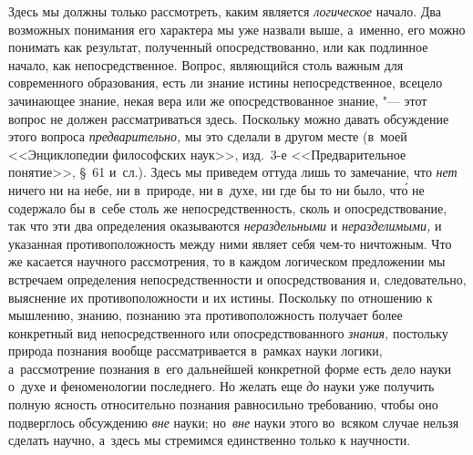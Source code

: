 Здесь мы должны только рассмотреть, каким является {\em логическое} начало. Два
возможных понимания его характера мы уже назвали выше, а~именно, его можно
понимать как результат, полученный опосредствованно, или как подлинное начало,
как непосредственное. Вопрос, являющийся столь важным для современного
образования, есть ли знание истины непосредственное, всецело зачинающее знание,
некая вера или же опосредствованное знание, "--- этот вопрос не должен
рассматриваться здесь. Поскольку можно давать обсуждение этого вопроса
{\em предварительно,} мы это сделали в другом месте (в~моей <<Энциклопедии
философских наук>>, изд.~3-е <<Предварительное понятие>>, \S~61 и~сл.). Здесь
мы приведем оттуда лишь то замечание, что {\em нет} ничего ни на небе, ни
в~природе, ни в~духе, ни где бы то ни было, чт\'{о} не содержало бы в~себе
столь же непосредственность, сколь и опосредствование, так что эти два
определения оказываются {\em нераздельными} и {\em неразделимыми,} и указанная
противоположность между ними являет себя чем-то ничтожным. Что же касается
научного рассмотрения, то в каждом логическом предложении мы встречаем
определения непосредственности и опосредствования и, следовательно, выяснение
их противоположности и их истины. Поскольку по отношению к мышлению, знанию,
познанию эта противоположность получает более конкретный вид непосредственного
или опосредствованного {\em знания,} постольку природа познания вообще
рассматривается в~рамках науки логики, а~рассмотрение познания в~его дальнейшей
конкретной форме есть дело науки о~духе и феноменологии последнего. Но желать
еще {\em до} науки уже получить полную ясность относительно познания
равносильно требованию, чтобы оно подверглось обсуждению {\em вне} науки;
но~{\em вне} науки этого во~всяком случае нельзя сделать научно, а~здесь мы
стремимся единственно только к научности.

